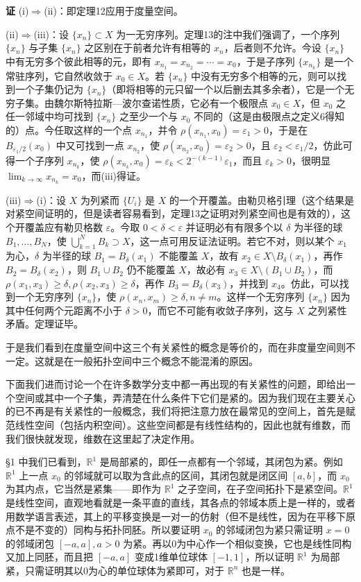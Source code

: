 \noindent\textbf{证}\quad
(i)$\Rightarrow$(ii)：即定理12应用于度量空间。

(ii)$\Rightarrow$(iii)：设 $\{x_n\}\subset X$ 为一无穷序列。定理13的注中我们强调了，一个序列 $\{x_n\}$ 与子集 $\{x_n\}$ 之区别在于前者允许有相等的 $x_n$，后者则不允许。今设 $\{x_n\}$ 中有无穷多个彼此相等的元，即有 $x_{n_1}=x_{n_2}=\cdots=x_0$，于是子序列 $\{x_{n_k}\}$ 是一个常驻序列，它自然收敛于 $x_0\in X$。若 $\{x_n\}$ 中没有无穷多个相等的元，则可以找到一个子集仍记为 $\{x_n\}$（即将相等的元只留一个以后删去其多余者），它是一个无穷子集。由魏尔斯特拉斯—波尔查诺性质，它必有一个极限点 $x_0\in X$，但 $x_0$ 之任一邻域中均可找到 $\{x_n\}$ 之至少一个与 $x_0$ 不同的（这是由极限点之定义6得知的）点。今任取这样的一个点 $x_{n_1}$，并令 $\rho(x_{n_1},x_0)=\varepsilon_1>0$，于是在 $B_{\varepsilon_1/2}(x_0)$ 中又可找到一点 $x_{n_2}$，使 $\rho(x_{n_2},x_0)=\varepsilon_2>0$，且 $\varepsilon_2<\varepsilon_1/2$，仿此可得一个子序列 $x_{n_k}$，使 $\rho(x_{n_k},x_0)=\varepsilon_k<2^{-(k-1)}\varepsilon_1$，而且 $\varepsilon_k>0$，很明显 $\lim_{k\to\infty}x_{n_k}=x_0$，而(iii)得证。

(iii)$\Rightarrow$(i)：设 $X$ 为列紧而 $\{U_i\}$ 是 $X$ 的一个开覆盖。由勒贝格引理（这个结果是对紧空间证明的，但是读者容易看到，定理13之证明对列紧空间也是有效的），这个开覆盖应有勒贝格数 $\varepsilon$。今取 $0<\delta<\varepsilon$ 并证明必有有限多个以 $\delta$ 为半径的球 $B_1,\ldots,B_N$，使 $\bigcup_{k=1}^N B_k\supset X$，这一点可用反证法证明。若它不对，则以某个 $x_1$ 为心，$\delta$ 为半径的球 $B_1=B_\delta(x_1)$ 不能覆盖 $X$，故有 $x_2\in X\setminus B_\delta(x_1)$，再作 $B_2=B_\delta(x_2)$，则 $B_1\cup B_2$ 仍不能覆盖 $X$，故必有 $x_3\in X\setminus(B_1\cup B_2)$，而 $\rho(x_1,x_3)\ge\delta,\rho(x_2,x_3)\ge\delta$，再作 $B_3=B_\delta(x_3)$，并找到 $x_4$。仿此，可以找到一个无穷序列 $\{x_n\}$，使 $\rho(x_n,x_m)\ge\delta,n\ne m$。这样一个无穷序列 $\{x_n\}$ 因为其中任何两个元距离不小于 $\delta>0$，而它不可能有收敛子序列，这与 $X$ 之列紧性矛盾。定理证毕。

于是我们看到在度量空间中这三个有关紧性的概念是等价的，而在非度量空间则不一定。这就是在一般拓扑空间中三个概念不能混淆的原因。

下面我们进而讨论一个在许多数学分支中都一再出现的有关紧性的问题，即给出一个空间或其中一个子集，弄清楚在什么条件下它们是紧的。因为我们现在主要关心的已不再是有关紧性的一般概念，我们将把注意力放在最常见的空间上，首先是赋范线性空间（包括内积空间）。这些空间都是有线性结构的，因此也就有维数，而我们很快就发现，维数在这里起了决定作用。

§1 中我们已看到，$\mathbb R^1$ 是局部紧的，即任一点都有一个邻域，其闭包为紧。例如 $\mathbb R^1$ 上一点 $x_0$ 的邻域就可以取为含此点的区间，其闭包就是闭区间 $[a,b]$，而 $x_0$ 为其内点，它当然是紧集——即作为 $\mathbb R^1$ 之子空间，在子空间拓扑下是紧空间。$\mathbb R^1$ 是线性空间，直观地看就是一条平直的直线，其各点的邻域本质上是一样的，或者用数学语言表述，其上的平移变换是一对一的仿射（但不是线性，因为在平移下原点不是不变的）同构与拓扑同胚。所以要证明 $x_0$ 的邻域闭包为紧只需证明 $x=0$ 的邻域闭包 $[-a,a],a>0$ 为紧。再以0为中心作一个相似变换，它也是线性同构又加上同胚，而且把 $[-a,a]$ 变成1维单位球体 $[-1,1]$，所以证明 $\mathbb R^1$ 为局部紧，只需证明其以0为心的单位球体为紧即可，对于 $\mathbb R^n$ 也是一样。


